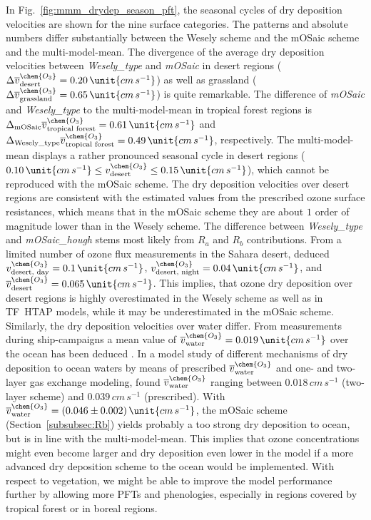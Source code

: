 \documentclass[gmd, manuscript]{copernicus}
\begin{document}
In Fig.~\ref{fig:mmm_drydep_season_pft}, the seasonal cycles of dry deposition velocities are shown for the nine surface categories. The patterns and absolute numbers differ substantially between the Wesely scheme and the mOSaic scheme and the multi-model-mean. The divergence of the average dry deposition velocities between \emph{Wesely\_type} and \emph{mOSaic} in desert regions ($\Delta \overline{v}_\text{desert}^\chem{O_3} = 0.20\,\unit{cm\,s^{-1}}$) as well as grassland ($\Delta \overline{v}_\text{grassland}^\chem{O_3} = 0.65\,\unit{cm\,s^{-1}}$) is quite remarkable. The difference of \emph{mOSaic} and \emph{Wesely\_type} to the multi-model-mean in tropical forest regions is $\Delta_\text{mOSaic} \overline{v}_\text{tropical forest}^\chem{O_3} = 0.61\,\unit{cm\,s^{-1}}$ and $\Delta_\text{Wesely\_type} \overline{v}_\text{tropical forest}^\chem{O_3} = 0.49\,\unit{cm\,s^{-1}}$, respectively. The multi-model-mean displays a rather pronounced seasonal cycle in desert regions ($0.10\,\unit{cm\,s^{-1}} \leq v^\chem{O_3}_\text{desert}\leq 0.15\,\unit{cm\,s^{-1}}$), which cannot be reproduced with the mOSaic scheme. The dry deposition velocities over desert regions are consistent with the estimated values from the prescribed ozone surface resistances, which means that in the mOSaic scheme they are about $1$ order of magnitude lower than in the Wesely scheme. The difference between \emph{Wesely\_type} and \emph{mOSaic\_hough} stems most likely from $R_a$ and $R_b$ contributions. From a limited number of ozone flux measurements in the Sahara desert, \citet{AE:Gusten1995} deduced $v^\chem{O_3}_\text{desert, day} = 0.1\,\unit{cm\,s^{-1}}$, $v^\chem{O_3}_\text{desert, night} = 0.04\,\unit{cm\,s^{-1}}$, and $\overline{v}^\chem{O_3}_\text{desert} = 0.065\,\unit{cm\,s^{-1}}$. This implies, that ozone dry deposition over desert regions is highly overestimated in the Wesely scheme as well as in TF~HTAP models, while it may be underestimated in the mOSaic scheme. Similarly, the dry deposition velocities over water differ. From measurements during ship-campaigns a mean value of $\overline{v}^\chem{O_3}_\text{water} = 0.019\,\unit{cm\,s^{-1}}$ over the ocean has been deduced \citep{JGR:Helmig2012}. In a model study of different mechanisms of dry deposition to ocean waters by means of prescribed $\overline{v}_\text{water}^\chem{O_3}$ and one- and two-layer gas exchange modeling, \citet{ACP:Luhar2017} found $\overline{v}_\text{water}^\chem{O_3}$ ranging between $0.018\,\unit{cm\,s^{-1}}$ (two-layer scheme) and $0.039\,\unit{cm\,s^{-1}}$ (prescribed). With $\overline{v}^\chem{O_3}_\text{water} = (0.046\pm0.002)\,\unit{cm\,s^{-1}}$, the mOSaic scheme (Section~\ref{subsubsec:Rb}) yields probably a too strong dry deposition to ocean, but is in line with the multi-model-mean. This implies that ozone concentrations might even become larger and dry deposition even lower in the model if a more advanced dry deposition scheme to the ocean would be implemented. With respect to vegetation, we might be able to improve the model performance further by allowing more PFTs and phenologies, especially in regions covered by tropical forest \citep{GCB:Anav2017} or in boreal regions. 
\end{document}
